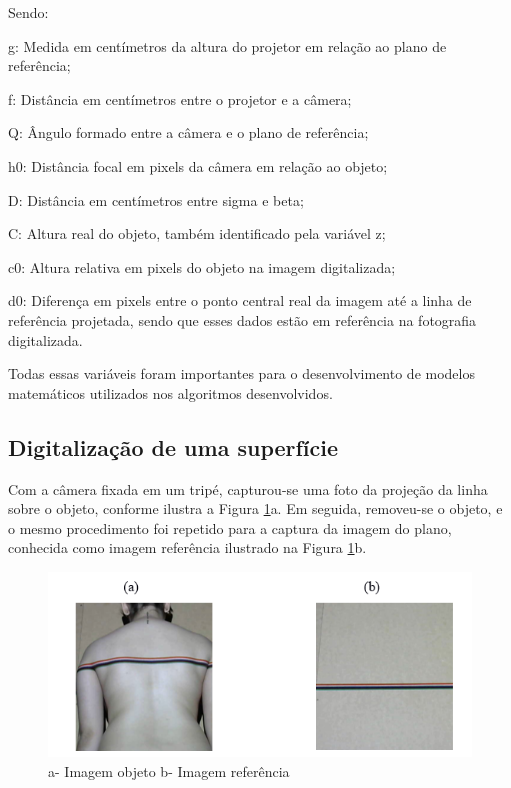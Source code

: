 \documentclass[a4paper, 12pt]{article}
\begin{document}
Sendo:

g: Medida em centímetros da altura do projetor em relação ao plano de referência;

f:  Distância em centímetros entre o projetor e a câmera;	          

Q: Ângulo formado entre a câmera e o plano de referência;

h0: Distância focal em pixels da câmera em relação ao objeto;  

D:  Distância em centímetros entre sigma e beta;

C: Altura real do objeto, também identificado pela variável z;

c0: Altura relativa em pixels do objeto na imagem digitalizada;

d0: Diferença em pixels entre o ponto central real da imagem até a linha de referência projetada, sendo que esses dados estão em referência na fotografia digitalizada. 
 
Todas essas variáveis foram importantes para o desenvolvimento de modelos matemáticos utilizados nos algoritmos desenvolvidos. 

\subsection{Digitalização de uma superfície}

Com a câmera fixada em um tripé, capturou-se uma foto da projeção da linha sobre o objeto, conforme ilustra a Figura \ref{imagem_projecao_colorida}a. Em seguida, removeu-se o objeto, e o mesmo procedimento foi repetido para a captura da imagem do plano, conhecida como imagem referência ilustrado na Figura \ref{imagem_projecao_colorida}b. 

\begin{figure}[H]
	\centering
		\includegraphics[scale=0.5]{imagem_projecao_colorida.png}
	\caption{a- Imagem objeto b- Imagem referência}
	\label{imagem_projecao_colorida}
\end{figure}
\end{document}
